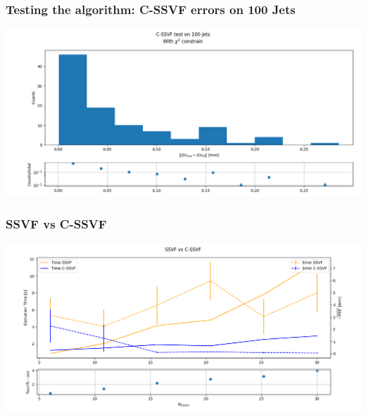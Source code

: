 \documentclass{beamer}
\begin{document}
\begin{frame}
    \frametitle{Testing the algorithm: C-SSVF errors on 100 Jets}
    \begin{center}
        \includegraphics[width=\textwidth]{../screenshots/cssvf.png}
    \end{center}
\end{frame}
\begin{frame}
    \frametitle{SSVF vs C-SSVF}
    \begin{center}
        \includegraphics[width=\textwidth]{../screenshots/ssvfVScssvf.png}
    \end{center}
\end{frame}
\end{document}
